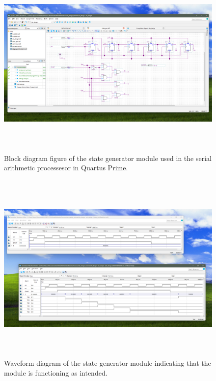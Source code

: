\documentclass[11pt,a4paper,english]{article}
\begin{document}
   \begin{figure}[h!]
    \centering
    \includegraphics*[height=95mm]{./ss/StageGenBDF.png}
    \caption{Block diagram figure of the state generator module used in the serial arithmetic processesor in Quartus Prime.}
    \label{figure}
   \end{figure}

   \begin{figure}[h!]
    \centering
    \includegraphics[height=95mm]{./ss/StageGenWaveform.png}
    \caption{Waveform diagram of the state generator module indicating that the module is functioning as intended.}
    \label{figure}
   \end{figure}
\end{document}
